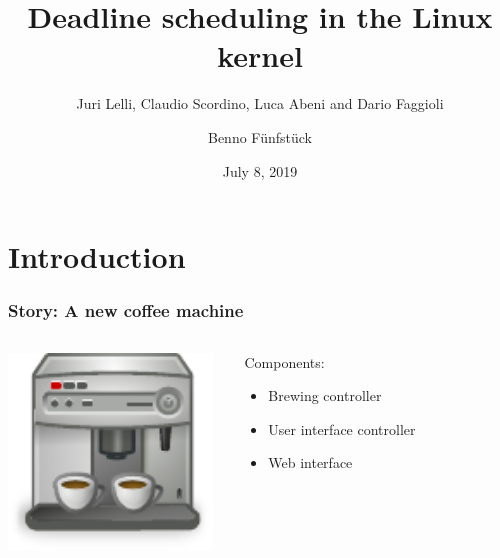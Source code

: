 \documentclass[aspectratio=1610,xcolor=svgnames]{beamer}
\title{Deadline scheduling in the Linux kernel}
\subtitle{Juri Lelli, Claudio Scordino, Luca Abeni and Dario Faggioli}
\date{July 8, 2019}
\author{Benno Fünfstück}
\begin{document}

\maketitle

\section{Introduction}

\begin{frame}\frametitle{Story: A new coffee machine}
  \vspace{1cm}
  \begin{columns}
    \begin{column}{0.5\textwidth}
      \includegraphics[width=0.95\textwidth]{coffee.pdf}
    \end{column}
    \begin{column}{0.5\textwidth}
      {\Large Components:}
      \begin{itemize}
      \item Brewing controller
      \item User interface controller
      \item Web interface
      \end{itemize}
      \vspace{1cm}
    \end{column}
  \end{columns}
\end{frame}
\end{document}
